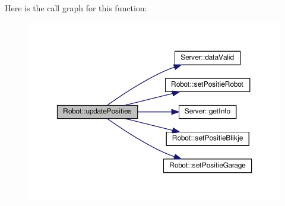 Here is the call graph for this function\-:
\nopagebreak
\begin{figure}[H]
\begin{center}
\leavevmode
\includegraphics[width=350pt]{classRobot_a980d1f972db40e5afcf3e2caf6ba346c_cgraph}
\end{center}
\end{figure}




